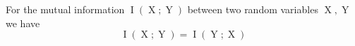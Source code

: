 For the mutual information $\operatorname{I}(\operatorname{X}; \operatorname{Y})$ between two random variables $\operatorname{X}, \operatorname{Y}$ we have
$$\operatorname{I}(\operatorname{X}; \operatorname{Y}) = \operatorname{I}(\operatorname{Y}; \operatorname{X})$$ 
